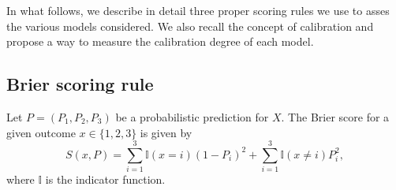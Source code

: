 \documentclass[journal,article,accept,moreauthors,pdftex,12pt,a4paper]{mdpi}
\begin{document}
    In what follows, we describe in detail three proper scoring rules we use to asses the various models considered.
    We also recall the concept of calibration and propose a way to measure the calibration degree of each model.




    \subsection{Brier scoring rule}

    Let $P=(P_1,P_2,P_3)$ be a probabilistic prediction  for $X$.
    The Brier score for a given outcome $x\in\{1,2,3\}$ is given by
    $$S(x,P)= \sum_{i=1}^3\mathbb{I}(x=i)(1- P_i)^2+\sum_{i=1}^3\mathbb{I}(x\neq i)P^2_i,$$
    where $\mathbb{I}$ is the indicator function.
\end{document}
